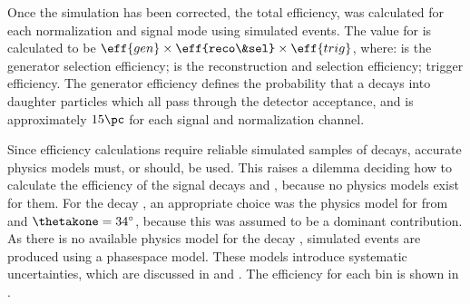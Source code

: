 Once the simulation has been corrected, the total efficiency,  was calculated for each
normalization and signal mode using simulated events.
The value for  is calculated to be $\eff{gen}\times\eff{reco\&sel}\times\eff{trig}$, where:
 is the generator selection efficiency;
 is the reconstruction and selection efficiency;
 trigger efficiency.
The generator efficiency defines the probability that a \Bp decays into daughter particles which
all pass through the \lhcb detector acceptance, and is approximately $15\pc$ for each signal and
normalization channel.





Since efficiency calculations require reliable simulated samples of decays, accurate physics
models must, or should, be used.
This raises a dilemma deciding how to calculate the efficiency of the signal decays \btokpipimumu
and \btophikmumu, because no physics models exist for them.
For the decay \btokpipimumu, an appropriate choice
was the physics model for 
from  and $\thetakone=34^\circ$, because this was assumed to be a dominant
contribution.
As there is no available physics model for the decay \btophikmumu, simulated events are produced
using a phasespace model.
These models introduce systematic uncertainties, which are discussed in  and
.
The efficiency for each \qsq bin is shown in .


